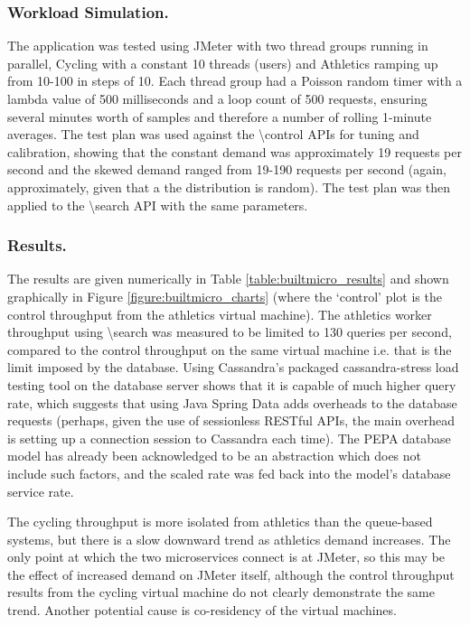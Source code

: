 \subsubsection{Workload Simulation.}  The application was tested using JMeter with two thread groups running in parallel, Cycling with a constant 10 threads (users) and Athletics ramping up from 10-100 in steps of 10.  Each thread group had a Poisson random timer with a lambda value of 500 milliseconds and a loop count of 500 requests, ensuring several minutes worth of samples and therefore a number of rolling 1-minute averages.  The test plan was used against the {\textbackslash control} APIs for tuning and calibration, showing that the constant demand was approximately 19 requests per second and the skewed demand ranged from 19-190 requests per second (again, approximately, given that a the distribution is random). The test plan was then applied to the {\textbackslash search} API with the same parameters.

\subsubsection{Results.}  The results are given numerically in Table \ref{table:builtmicro_results} and shown graphically in Figure \ref{figure:builtmicro_charts} (where the `control' plot is the control throughput from the athletics virtual machine).  The athletics worker throughput using {\textbackslash search} was measured to be limited to 130 queries per second, compared to the control throughput on the same virtual machine i.e. that is the limit imposed by the database.  Using Cassandra's packaged cassandra-stress load testing tool on the database server shows that it is capable of much higher query rate, which suggests that using Java Spring Data adds overheads to the database requests (perhaps, given the use of sessionless RESTful APIs, the main overhead is setting up a connection session to Cassandra each time).  The PEPA database model has already been acknowledged to be an abstraction which does not include such factors, and the scaled rate was fed back into the model's database service rate.

The cycling throughput is more isolated from athletics than the queue-based systems, but there is a slow downward trend as athletics demand increases.  The only point at which the two microservices connect is at JMeter, so this may be the effect of increased demand on JMeter itself, although the control throughput results from the cycling virtual machine do not clearly demonstrate the same trend.  Another potential cause is co-residency of the virtual machines.

